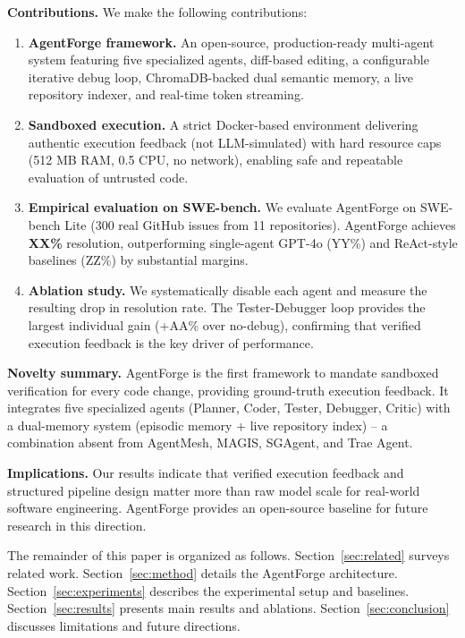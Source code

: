 \textbf{Contributions.} We make the following contributions:
\begin{enumerate}
    \item \textbf{AgentForge framework.} An open-source, production-ready multi-agent system featuring five specialized agents, diff-based editing, a configurable iterative debug loop, ChromaDB-backed dual semantic memory, a live repository indexer, and real-time token streaming.
    \item \textbf{Sandboxed execution.} A strict Docker-based environment delivering authentic execution feedback (not LLM-simulated) with hard resource caps (512 MB RAM, 0.5 CPU, no network), enabling safe and repeatable evaluation of untrusted code.
    \item \textbf{Empirical evaluation on SWE-bench.} We evaluate AgentForge on SWE-bench Lite (300 real GitHub issues from 11 repositories). AgentForge achieves \textbf{XX\%} resolution, outperforming single-agent GPT-4o (YY\%) and ReAct-style baselines (ZZ\%) by substantial margins.
    \item \textbf{Ablation study.} We systematically disable each agent and measure the resulting drop in resolution rate. The Tester-Debugger loop provides the largest individual gain (+AA\% over no-debug), confirming that verified execution feedback is the key driver of performance.
\end{enumerate}

\textbf{Novelty summary.} AgentForge is the first framework to mandate sandboxed verification for every code change, providing ground-truth execution feedback. It integrates five specialized agents (Planner, Coder, Tester, Debugger, Critic) with a dual-memory system (episodic memory + live repository index) – a combination absent from AgentMesh, MAGIS, SGAgent, and Trae Agent.

\textbf{Implications.} Our results indicate that verified execution feedback and structured pipeline design matter more than raw model scale for real-world software engineering. AgentForge provides an open-source baseline for future research in this direction.

The remainder of this paper is organized as follows. Section~\ref{sec:related} surveys related work. Section~\ref{sec:method} details the AgentForge architecture. Section~\ref{sec:experiments} describes the experimental setup and baselines. Section~\ref{sec:results} presents main results and ablations. Section~\ref{sec:conclusion} discusses limitations and future directions.